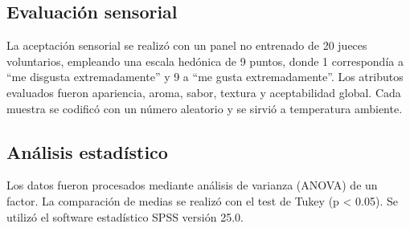 \documentclass[manuscript,screen,review]{acmart}
\begin{document}
\subsection{Evaluación sensorial}
La aceptación sensorial se realizó con un panel no entrenado de 20 jueces voluntarios, empleando una escala hedónica de 9 puntos, donde 1 correspondía a “me disgusta extremadamente” y 9 a “me gusta extremadamente”. Los atributos evaluados fueron apariencia, aroma, sabor, textura y aceptabilidad global. Cada muestra se codificó con un número aleatorio y se sirvió a temperatura ambiente.

\subsection{Análisis estadístico}
Los datos fueron procesados mediante análisis de varianza (ANOVA) de un factor. La comparación de medias se realizó con el test de Tukey (p < 0.05). Se utilizó el software estadístico SPSS versión 25.0.




\end{document}
